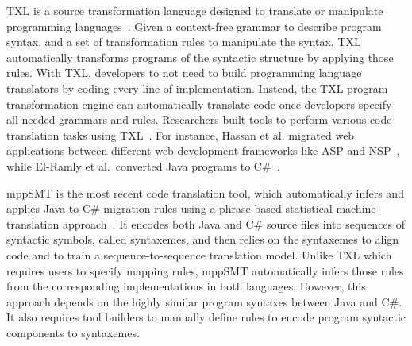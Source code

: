 TXL is a source transformation language designed to translate or manipulate programming languages~\cite{Cordy2006}. Given a context-free grammar to describe program syntax, and a set of transformation rules to manipulate the syntax, TXL automatically transforms programs of the syntactic structure by applying those rules. With TXL, developers to not need to build programming language translators by coding every line of implementation. Instead, the TXL program transformation engine can automatically translate code once developers specify all needed grammars and rules. Researchers built tools to perform various code translation tasks using TXL~\cite{Chu:08,Hassan:2005,El-Ramly:2006,Tonella:04}. For instance, Hassan et al. migrated web applications between different web development frameworks like ASP and NSP~\cite{Hassan:2005}, while El-Ramly et al.~converted Java programs to C\#~\cite{El-Ramly:2006}. 

mppSMT is the most recent code translation tool, which automatically infers and applies Java-to-C\# migration rules using a phrase-based statistical machine translation approach~\cite{Nguyen:15}. It encodes both Java and C\# source files into sequences of syntactic symbols, called syntaxemes, and then relies on the syntaxemes to align code and to train a sequence-to-sequence translation model. 
Unlike TXL which requires users to specify mapping rules, mppSMT automatically infers those rules from the corresponding implementations in both languages. 
However, this approach depends on the highly similar program syntaxes between Java and C\#. It also requires tool builders to manually define rules to encode program syntactic components to syntaxemes. 

